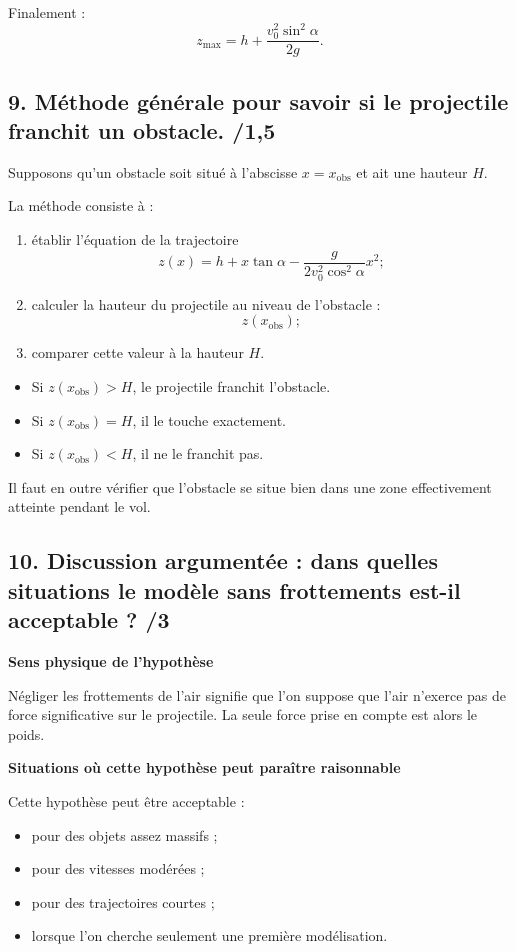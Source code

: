 \documentclass[11pt,a4paper]{article}
\begin{document}
Finalement :
\[
\boxed{z_{\max}=h+\frac{v_0^2\sin^2\alpha}{2g}.}
\]

\subsection*{9. Méthode générale pour savoir si le projectile franchit un obstacle. \hfill /1{,}5}

Supposons qu'un obstacle soit situé à l'abscisse \(x=x_{\text{obs}}\) et ait une hauteur \(H\).

La méthode consiste à :
\begin{enumerate}[label=\arabic*.]
    \item établir l'équation de la trajectoire
    \[
    z(x)=h+x\tan\alpha-\frac{g}{2v_0^2\cos^2\alpha}x^2 ;
    \]
    \item calculer la hauteur du projectile au niveau de l'obstacle :
    \[
    z(x_{\text{obs}}) ;
    \]
    \item comparer cette valeur à la hauteur \(H\).
\end{enumerate}

\begin{itemize}
    \item Si \(z(x_{\text{obs}})>H\), le projectile franchit l'obstacle.
    \item Si \(z(x_{\text{obs}})=H\), il le touche exactement.
    \item Si \(z(x_{\text{obs}})<H\), il ne le franchit pas.
\end{itemize}

Il faut en outre vérifier que l'obstacle se situe bien dans une zone effectivement atteinte pendant le vol.

\subsection*{10. Discussion argumentée : dans quelles situations le modèle sans frottements est-il acceptable ? \hfill /3}

\textbf{Sens physique de l'hypothèse}

Négliger les frottements de l'air signifie que l'on suppose que l'air n'exerce pas de force significative sur le projectile. La seule force prise en compte est alors le poids.

\medskip

\textbf{Situations où cette hypothèse peut paraître raisonnable}

Cette hypothèse peut être acceptable :
\begin{itemize}
    \item pour des objets assez massifs ;
    \item pour des vitesses modérées ;
    \item pour des trajectoires courtes ;
    \item lorsque l'on cherche seulement une première modélisation.
\end{itemize}
\end{document}
